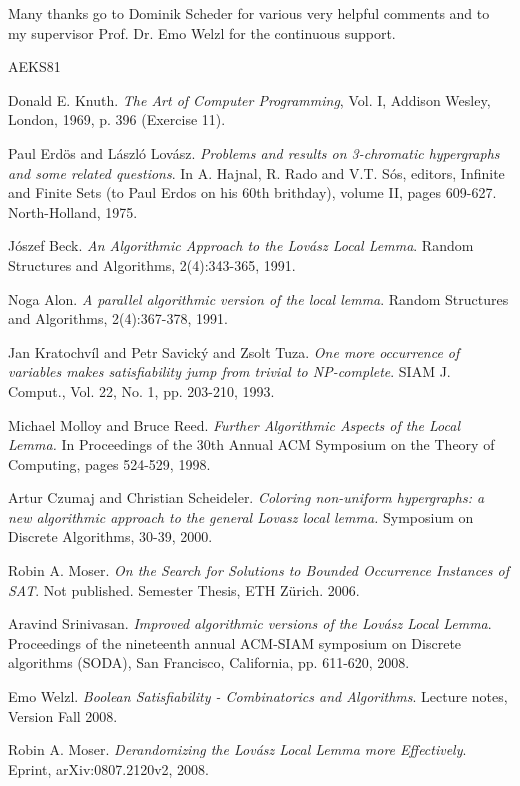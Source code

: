 \documentclass[11pt,a4paper]{article}
\begin{document}
Many thanks go to Dominik Scheder for various very helpful comments 
and to my supervisor Prof. Dr. Emo Welzl for the continuous support.

\newpage

\begin{thebibliography}{AEKS81}

Donald E. Knuth. 
\emph{The Art of Computer Programming}, Vol. I, Addison Wesley,
London, 1969, p. 396 (Exercise 11).

Paul Erd\"os and L\'aszl\'o Lov\'asz.
\emph{Problems and results on 3-chromatic hypergraphs and some related questions}. 
In A. Hajnal, R. Rado and V.T. S\'os, editors,
Infinite and Finite Sets (to Paul Erdos on his 60th brithday), volume II,
pages 609-627. North-Holland, 1975.

J\'oszef Beck.
\emph{An Algorithmic Approach to the Lov\'asz Local Lemma}.
Random Structures and Algorithms, 2(4):343-365, 1991.

Noga Alon. 
\emph{A parallel algorithmic version of the local lemma}.
Random Structures and Algorithms, 2(4):367-378, 1991.

Jan Kratochv\'il and Petr Savick\'y and Zsolt Tuza.
\emph{One more occurrence of variables makes satisfiability jump from trivial to NP-complete}. 
SIAM J. Comput., Vol. 22, No. 1, pp. 203-210, 1993.

Michael Molloy and Bruce Reed.
\emph{Further Algorithmic Aspects of the Local Lemma.} 
In Proceedings of the 30th Annual ACM Symposium on the Theory of Computing, pages 524-529, 1998.

Artur Czumaj and Christian Scheideler. 
\emph{Coloring non-uniform hypergraphs: a new algorithmic approach to the general Lovasz local lemma.} 
Symposium on Discrete Algorithms, 30-39, 2000.

Robin A. Moser.
\emph{On the Search for Solutions to Bounded Occurrence Instances of SAT}.
Not published. Semester Thesis, ETH Z\"urich. 2006.

Aravind Srinivasan.
\emph{Improved algorithmic versions of the Lov\'asz Local Lemma}.
Proceedings of the nineteenth annual ACM-SIAM symposium on Discrete algorithms (SODA),
San Francisco, California, pp. 611-620, 2008.

Emo Welzl.
\emph{Boolean Satisfiability - Combinatorics and Algorithms}.
Lecture notes, Version Fall 2008.

Robin A. Moser.
\emph{Derandomizing the Lov\'asz Local Lemma more Effectively}.
Eprint, arXiv:0807.2120v2, 2008.

\end{thebibliography}
\end{document}
